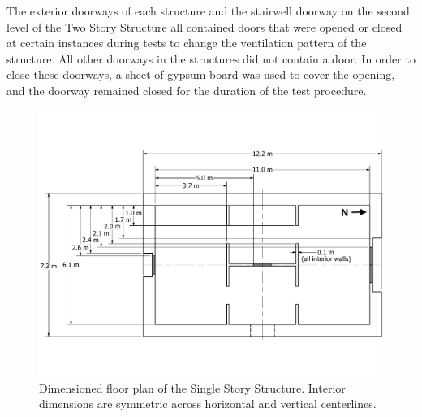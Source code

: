 \documentclass[12pt,oneside]{book}
\begin{document}
The exterior doorways of each structure and the stairwell doorway on the second level of the Two Story Structure all contained doors that were opened or closed at certain instances during tests to change the ventilation pattern of the structure. All other doorways in the structures did not contain a door. In order to close these doorways, a sheet of gypsum board was used to cover the opening, and the doorway remained closed for the duration of the test procedure.
\clearpage

\begin{figure}[!ht]
	\includegraphics[width=\columnwidth]{../Figures/Floor_Plans/East_Test_Structure_Dimensioned_Full}
	\caption[Dimensioned floor plan of the Single Story Structure.]{Dimensioned floor plan of the Single Story Structure. Interior dimensions are symmetric across horizontal and vertical centerlines.}
	\label{fig:east_dimensioned_plan}
\end{figure}
\end{document}
